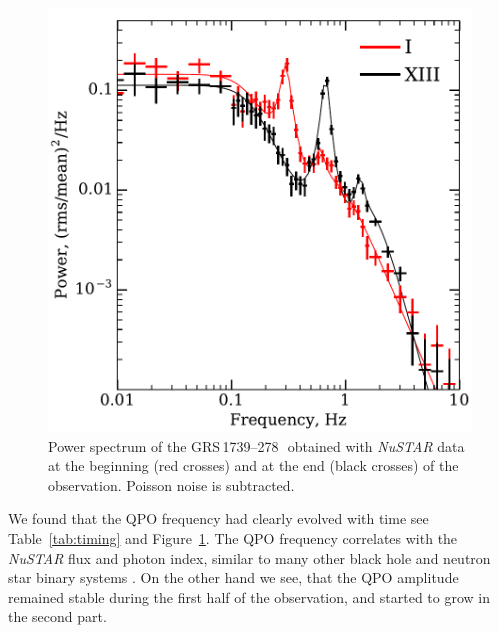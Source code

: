 \documentclass[a4paper,fleqn,usenatbib]{mnras}
\def\grs{{GRS\,1739--278\,}}
\begin{document}
\begin{figure}
        \includegraphics[width=\columnwidth]{qpo_centroid_evolution.pdf}
        \caption{Power spectrum of the \grs\ obtained with {\it NuSTAR} data at the beginning (red crosses) and at the end (black crosses) of the observation. Poisson noise is subtracted.}
        \label{fig:qpo}
\end{figure}


We found that the QPO frequency had clearly evolved with time see Table~\ref{tab:timing} and Figure~\ref{fig:qpo}.
The QPO frequency correlates with the {\it NuSTAR} flux and photon index, similar to many other black hole and neutron star binary systems \citep[see, e.g.,][]{vignarca03,2003A&A...407.1039P}.
On the other hand we see, that the QPO amplitude remained stable during the first half of the observation, and started to grow in the second part.
\end{document}

